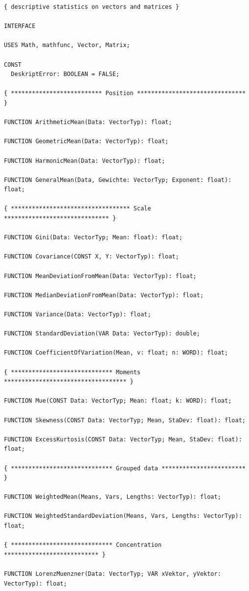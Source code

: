 \begin{refsection}
\begin{lstlisting}[caption=Interface of descript]
{ descriptive statistics on vectors and matrices }

INTERFACE

USES Math, mathfunc, Vector, Matrix;

CONST
  DeskriptError: BOOLEAN = FALSE;

{ ************************** Position ******************************* }

FUNCTION ArithmeticMean(Data: VectorTyp): float;

FUNCTION GeometricMean(Data: VectorTyp): float;

FUNCTION HarmonicMean(Data: VectorTyp): float;

FUNCTION GeneralMean(Data, Gewichte: VectorTyp; Exponent: float): float;

{ ********************************** Scale ****************************** }

FUNCTION Gini(Data: VectorTyp; Mean: float): float;

FUNCTION Covariance(CONST X, Y: VectorTyp): float;

FUNCTION MeanDeviationFromMean(Data: VectorTyp): float;

FUNCTION MedianDeviationFromMean(Data: VectorTyp): float;

FUNCTION Variance(Data: VectorTyp): float;

FUNCTION StandardDeviation(VAR Data: VectorTyp): double;

FUNCTION CoefficientOfVariation(Mean, v: float; n: WORD): float;

{ ***************************** Moments *********************************** }

FUNCTION Mue(CONST Data: VectorTyp; Mean: float; k: WORD): float;

FUNCTION Skewness(CONST Data: VectorTyp; Mean, StaDev: float): float;

FUNCTION ExcessKurtosis(CONST Data: VectorTyp; Mean, StaDev: float): float;

{ ***************************** Grouped data ************************ }

FUNCTION WeightedMean(Means, Vars, Lengths: VectorTyp): float;

FUNCTION WeightedStandardDeviation(Means, Vars, Lengths: VectorTyp): float;

{ ***************************** Concentration *************************** }

FUNCTION LorenzMuenzner(Data: VectorTyp; VAR xVektor, yVektor: VectorTyp): float;


\end{lstlisting}
\end{refsection}
